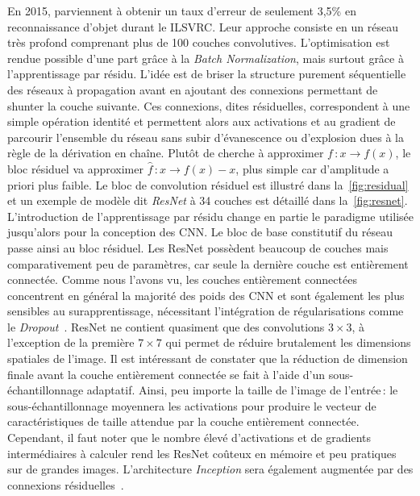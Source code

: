 En 2015, \citet{he_deep_2016} parviennent à obtenir un taux d'erreur de seulement 3,5\% en reconnaissance d'objet durant le \gls{ILSVRC}. Leur approche consiste en un réseau très profond comprenant plus de 100 couches convolutives. L'optimisation est rendue possible d'une part grâce à la \emph{Batch Normalization}, mais surtout grâce à l'apprentissage par résidu. L'idée est de briser la structure purement séquentielle des réseaux à propagation avant en ajoutant des connexions permettant de shunter la couche suivante. Ces connexions, dites résiduelles, correspondent à une simple opération identité et permettent alors aux activations et au gradient de parcourir l'ensemble du réseau sans subir d’évanescence ou d'explosion dues à la règle de la dérivation en chaîne. Plutôt de cherche à approximer $f\,: x \rightarrow f(x)$, le bloc résiduel va approximer $\hat{f}\,: x \rightarrow f(x) - x$, plus simple car d'amplitude a priori plus faible. Le bloc de convolution résiduel est illustré dans la~\cref{fig:residual} et un exemple de modèle dit \emph{ResNet} à 34 couches est détaillé dans la~\cref{fig:resnet}. L'introduction de l'apprentissage par résidu change en partie le paradigme utilisée jusqu'alors pour la conception des \gls{CNN}. Le bloc de base constitutif du réseau passe ainsi au bloc résiduel.
Les ResNet possèdent beaucoup de couches mais comparativement peu de paramètres, car seule la dernière couche est entièrement connectée. Comme nous l'avons vu, les couches entièrement connectées concentrent en général la majorité des poids des \gls{CNN} et sont également les plus sensibles au surapprentissage, nécessitant l'intégration de régularisations comme le \emph{Dropout}~\cite{srivastava_dropout_2014}. ResNet ne contient quasiment que des convolutions $3\times3$, à l'exception de la première $7\times7$ qui permet de réduire brutalement les dimensions spatiales de l'image. Il est intéressant de constater que la réduction de dimension finale avant la couche entièrement connectée se fait à l'aide d'un sous-échantillonnage adaptatif. Ainsi, peu importe la taille de l'image de l'entrée\,: le sous-échantillonnage moyennera les activations pour produire le vecteur de caractéristiques de taille attendue par la couche entièrement connectée. Cependant, il faut noter que le nombre élevé d'activations et de gradients intermédiaires à calculer rend les ResNet coûteux en mémoire et peu pratiques sur de grandes images. L'architecture \emph{Inception} sera également augmentée par des connexions résiduelles~\cite{szegedy_inception-v4_2017}.


